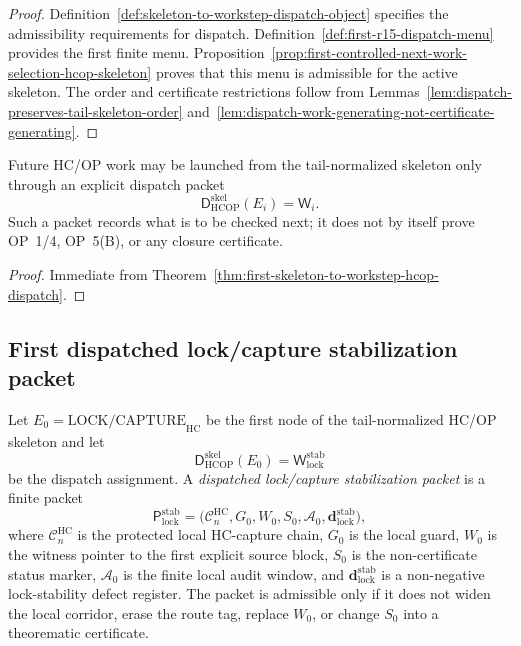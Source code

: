 \begin{proof}
Definition~\ref{def:skeleton-to-workstep-dispatch-object} specifies the admissibility requirements for dispatch. Definition~\ref{def:first-r15-dispatch-menu} provides the first finite menu. Proposition~\ref{prop:first-controlled-next-work-selection-hcop-skeleton} proves that this menu is admissible for the active skeleton. The order and certificate restrictions follow from Lemmas~\ref{lem:dispatch-preserves-tail-skeleton-order} and~\ref{lem:dispatch-work-generating-not-certificate-generating}.
\end{proof}

\begin{corollary}
\label{cor:v3340-r15-working-rule}
Future HC/OP work may be launched from the tail-normalized skeleton only through an explicit dispatch packet
\[
 \mathsf D_{\mathrm{HCOP}}^{\mathrm{skel}}(E_i)=\mathsf W_i .
\]
Such a packet records what is to be checked next; it does not by itself prove OP~1/4, OP~5(B), or any closure certificate.
\end{corollary}

\begin{proof}
Immediate from Theorem~\ref{thm:first-skeleton-to-workstep-hcop-dispatch}.
\end{proof}


\subsection{First dispatched lock/capture stabilization packet}
\label{subsec:first-dispatched-lock-capture-stabilization-packet}

\begin{definition}
\label{def:dispatched-lock-capture-stabilization-packet}
Let \(E_0=\mathrm{LOCK/CAPTURE}_{\mathrm{HC}}\) be the first node of the tail-normalized HC/OP skeleton and let
\[
 \mathsf D_{\mathrm{HCOP}}^{\mathrm{skel}}(E_0)
 =
 \mathsf W_{\mathrm{lock}}^{\mathrm{stab}}
\]
be the dispatch assignment. A \emph{dispatched lock/capture stabilization packet} is a finite packet
\[
 \mathsf P_{\mathrm{lock}}^{\mathrm{stab}}
 =
 \bigl(\mathcal C_n^{\mathrm{HC}},G_0,W_0,S_0,\mathcal A_0,\mathbf d_{\mathrm{lock}}^{\mathrm{stab}}\bigr),
\]
where \(\mathcal C_n^{\mathrm{HC}}\) is the protected local HC-capture chain, \(G_0\) is the local guard, \(W_0\) is the witness pointer to the first explicit source block, \(S_0\) is the non-certificate status marker, \(\mathcal A_0\) is the finite local audit window, and \(\mathbf d_{\mathrm{lock}}^{\mathrm{stab}}\) is a non-negative lock-stability defect register. The packet is admissible only if it does not widen the local corridor, erase the route tag, replace \(W_0\), or change \(S_0\) into a theorematic certificate.
\end{definition}

